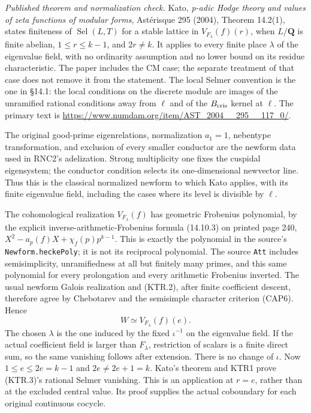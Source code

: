 \documentclass[11pt,a4paper]{article}
\numberwithin{equation}{section}
\theoremstyle{remark}\newtheorem{remark}[theorem]{Remark}
\begin{document}
\emph{Published theorem and normalization check.}
Kato, \emph{p-adic Hodge theory and values of zeta functions of
modular forms}, Ast\'erisque 295 (2004), Theorem 14.2(1),
states finiteness of \(\operatorname{Sel}(L,T)\) for a stable
lattice in \(V_{F_\lambda}(f)(r)\), when \(L/\mathbf Q\)
is finite abelian, \(1\le r\le k-1\), and \(2r\ne k\).
It applies to every finite place \(\lambda\) of the eigenvalue
field, with no ordinarity assumption and no lower bound on its
residue characteristic.  The paper includes the CM case; the
separate treatment of that case does not remove it from the
statement.  The local Selmer convention is the one in \S14.1:
the local conditions on the discrete module are images of the
unramified rational conditions away from \(\ell\) and of the
\(B_{\rm cris}\) kernel at \(\ell\).
The primary text is
\url{https://www.numdam.org/item/AST_2004__295__117_0/}.

The original good-prime eigenrelations, normalization
\(a_1=1\), nebentype transformation, and exclusion of every
smaller conductor are the newform data used in RNC2's
adelization.  Strong multiplicity one fixes the cuspidal
eigensystem; the conductor condition selects its one-dimensional
newvector line.  Thus this is the classical normalized newform
to which Kato applies, with its finite eigenvalue field, including
the cases where its level is divisible by \(\ell\).

The cohomological realization \(V_{F_\lambda}(f)\) has geometric
Frobenius polynomial, by the explicit inverse-arithmetic-Frobenius
formula (14.10.3) on printed page 240,
\(X^2-a_p(f)X+\chi_f(p)p^{k-1}\).
This is exactly the polynomial in the source's
\texttt{Newform.\allowbreak hecke\allowbreak Poly}; it is not its reciprocal polynomial.
The source \texttt{Att} includes semisimplicity, unramifiedness
at all but finitely many primes, and this same polynomial for
every prolongation and every arithmetic Frobenius inverted.
The usual newform Galois realization and (KTR.2), after finite
coefficient descent, therefore agree by Chebotarev and the
semisimple character criterion (CAP6).  Hence
\[
          W\simeq V_{F_\lambda}(f)(e).
 \tag{KTR.3}
\]
The chosen \(\lambda\) is the one induced by the fixed
\(\iota^{-1}\) on the eigenvalue field.  If the actual
coefficient field is larger than \(F_\lambda\), restriction
of scalars is a finite direct sum, so the same vanishing follows
after extension.  There is no change of \(\iota\).
Now \(1\le e\le2e=k-1\) and \(2e\ne2e+1=k\).
Kato's theorem and KTR1 prove (KTR.3)'s rational Selmer vanishing.
This is an application at \(r=e\), rather than at the excluded
central value.  Its proof supplies the actual coboundary for
each original continuous cocycle.
\end{document}
